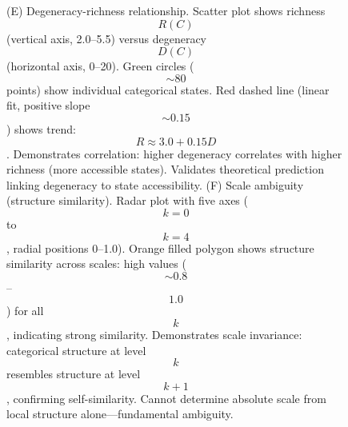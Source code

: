 \begin{figure}[htbp]
{                                (E) Degeneracy-richness relationship. Scatter plot shows richness $$R(C)$$ (vertical axis, 2.0--5.5) versus degeneracy $$D(C)$$ (horizontal axis, 0--20). Green circles ($$\sim 80$$ points) show individual categorical states. Red dashed line (linear fit, positive slope $$\sim 0.15$$) shows trend: $$R \approx 3.0 + 0.15 D$$. Demonstrates correlation: higher degeneracy correlates with higher richness (more accessible states). Validates theoretical prediction linking degeneracy to state accessibility. 
                                (F) Scale ambiguity (structure similarity). Radar plot with five axes ($$k=0$$ to $$k=4$$, radial positions 0--1.0). Orange filled polygon shows structure similarity across scales: high values ($$\sim 0.8$$--$$1.0$$) for all $$k$$, indicating strong similarity. Demonstrates scale invariance: categorical structure at level $$k$$ resembles structure at level $$k+1$$, confirming self-similarity. Cannot determine absolute scale from local structure alone—fundamental ambiguity.}
                                \label{fig:system_topology_validation}
                                \end{figure}

